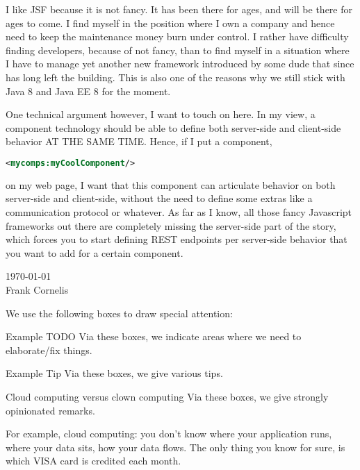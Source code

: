I like JSF because it is not fancy.
It has been there for ages, and will be there for ages to come.
I find myself in the position where I own a company and hence need to keep the maintenance money burn under control.
I rather have difficulty finding developers, because of not fancy, than to find myself in a situation where I have to manage yet another new framework introduced by some dude that since has long left the building.
This is also one of the reasons why we still stick with Java 8 \cite{GoslingJoyEtAl14} and Java EE 8 \cite{JavaEE8} for the moment.

One technical argument however, I want to touch on here.
In my view, a component technology should be able to define both server-side and client-side behavior AT THE SAME TIME.
Hence, if I put a component,
\begin{lstlisting}[language=XML]
	<mycomps:myCoolComponent/>
\end{lstlisting}
on my web page, I want that this component can articulate behavior on both server-side and client-side, without the need to define some extras like a communication protocol or whatever.
As far as I know, all those fancy Javascript frameworks out there are completely missing the server-side part of the story, which forces you to start defining REST endpoints per server-side behavior that you want to add for a certain component.

 \begin{flushright}
\today \\
Frank Cornelis 
\end{flushright}

We use the following boxes to draw special attention:
\begin{TODO}{Example TODO}
	Via these boxes, we indicate areas where we need to elaborate/fix things.
\end{TODO}
\begin{TIP}{Example Tip}
	Via these boxes, we give various tips.
\end{TIP}
\begin{ClownComputing}{Cloud computing versus clown computing}
	Via these boxes, we give strongly opinionated remarks.
	
	For example, cloud computing: you don't know where your application runs, where your data sits, how your data flows.
	The only thing you know for sure, is which VISA card is credited each month.  
\end{ClownComputing}